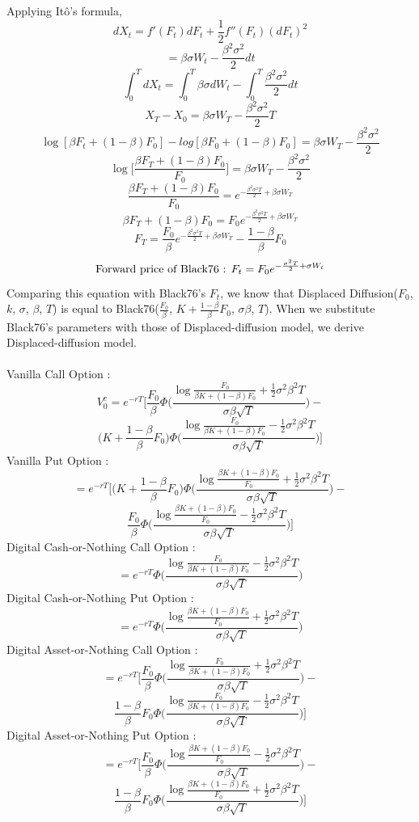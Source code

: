 \documentclass[fleqn,12pt]{SelfArx}
\begin{document}
Applying It\^{o}'s formula,
$$
dX_t = f'(F_t)dF_t + \frac{1}{2}f''(F_t)(dF_t)^{2}
$$$$
= \beta\sigma W_t - \frac{\beta^{2}\sigma^{2}}{2}dt
$$$$
\int_{0}^{T}dX_t = \int_{0}^{T}\beta \sigma dW_t - \int_{0}^{T}\frac{\beta^{2}\sigma^{2}}{2}dt
$$$$
X_T-X_0 = \beta\sigma W_T - \frac{\beta^{2}\sigma^{2}}{2}T
$$$$
\log[\beta F_t+(1-\beta)F_0] - log[\beta F_0+(1-\beta)F_0] = \beta\sigma W_T - \frac{\beta^{2}\sigma^{2}}{2}
$$$$
\log\bigg[\frac{\beta F_T+(1-\beta)F_0}{F_0}\bigg] = \beta\sigma W_T - \frac{\beta^{2}\sigma^{2}}{2}
$$$$
\frac{\beta F_T+(1-\beta)F_0}{F_0} = e^{-\frac{\beta^{2}\sigma^{2}T}{2} + \beta\sigma W_T}
$$$$
\beta F_T+(1-\beta)F_0 = F_0e^{-\frac{\beta^{2}\sigma^{2}T}{2} + \beta\sigma W_T}
$$$$
F_T = \frac{F_0}{\beta}e^{-\frac{\beta^{2}\sigma^{2}T}{2} + \beta\sigma W_T}-\frac{1-\beta}{\beta}F_0
$$
$$
\textnormal{Forward price of Black76 : } F_t = F_0e^{-\frac{\sigma^{2}T}{2} + \sigma W_t}
$$
Comparing this equation with Black76's $F_t$, we know that Displaced Diffusion($F_0$, $k$, $\sigma$, $\beta$, $T$) is equal to Black76($\frac{F_0}{\beta}$, $K+\frac{1-\beta}{\beta}F_0$, $\sigma\beta$, $T$). When we substitute Black76's parameters with those of Displaced-diffusion model, we derive Displaced-diffusion model.
\\
\\
Vanilla Call Option : 
$$
V_0^{c} = e^{-rT}\Bigg[\frac{F_0}{\beta} \Phi\Bigg(\frac{\log{\frac{F_0}{\beta K +(1-\beta)F_0}}+\frac{1}{2}\sigma^{2}\beta^{2}T}{\sigma\beta\sqrt{T}}\Bigg) -
$$$$
\Bigg(K + \frac{1-\beta}{\beta}F_0\Bigg)\Phi\Bigg(\frac{\log{\frac{F_0}{\beta K +(1-\beta)F_0}}-\frac{1}{2}\sigma^{2}\beta^{2}T}{\sigma\beta\sqrt{T}}\Bigg)\Bigg]
$$
Vanilla Put Option : 
$$
= e^{-rT}\Bigg[\Bigg(K + \frac{1-\beta}{\beta}F_0\Bigg)\Phi\Bigg(\frac{\log{\frac{\beta K +(1-\beta)F_0}{F_0}}+\frac{1}{2}\sigma^{2}\beta^{2}T}{\sigma\beta\sqrt{T}}\Bigg) - 
$$$$
\frac{F_0}{\beta}\Phi\Bigg(\frac{\log{\frac{\beta K +(1-\beta)F_0}{F_0}}-\frac{1}{2}\sigma^{2}\beta^{2}T}{\sigma\beta\sqrt{T}}\Bigg)\Bigg]
$$
Digital Cash-or-Nothing Call Option :
$$
= e^{-rT}\Phi\Bigg(\frac{\log{\frac{F_0}{\beta K +(1-\beta)F_0}}-\frac{1}{2}\sigma^{2}\beta^{2}T}{\sigma\beta\sqrt{T}}\Bigg)
$$
Digital Cash-or-Nothing Put Option :
$$
= e^{-rT}\Phi\Bigg(\frac{\log{\frac{\beta K +(1-\beta)F_0}{F_0}}+\frac{1}{2}\sigma^{2}\beta^{2}T}{\sigma\beta\sqrt{T}}\Bigg)
$$
Digital Asset-or-Nothing Call Option :
$$
= e^{-rT}\Bigg[\frac{F_0}{\beta}\Phi\Bigg(\frac{\log{\frac{F_0}{\beta K +(1-\beta)F_0}}+\frac{1}{2}\sigma^{2}\beta^{2}T}{\sigma\beta\sqrt{T}}\Bigg) - 
$$$$
\frac{1-\beta}{\beta}F_0\Phi\Bigg(\frac{\log{\frac{F_0}{\beta K +(1-\beta)F_0}}-\frac{1}{2}\sigma^{2}\beta^{2}T}{\sigma\beta\sqrt{T}}\Bigg)\Bigg]
$$
Digital Asset-or-Nothing Put Option :
$$
=e^{-rT}\Bigg[\frac{F_0}{\beta}\Phi\Bigg(\frac{\log{\frac{\beta K +(1-\beta)F_0}{F_0}}-\frac{1}{2}\sigma^{2}\beta^{2}T}{\sigma\beta\sqrt{T}}\Bigg) - 
$$$$
\frac{1-\beta}{\beta}F_0\Phi\Bigg(\frac{\log{\frac{\beta K +(1-\beta)F_0}{F_0}}+\frac{1}{2}\sigma^{2}\beta^{2}T}{\sigma\beta\sqrt{T}}\Bigg)\bigg]
$$
\end{document}
